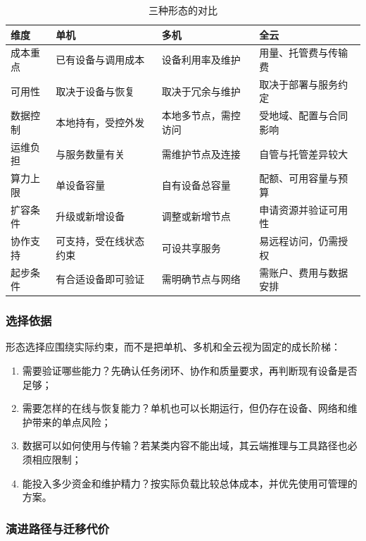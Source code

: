 \documentclass[11pt,a4paper]{article}
\begin{document}
\begin{table}[H]
\centering
\renewcommand{\arraystretch}{1.4}
\begin{tabularx}{\textwidth}{P{2.6cm} P{2.8cm} P{2.8cm} L}
\toprule
\textbf{维度} & \textbf{单机} & \textbf{多机} & \textbf{全云} \\
\midrule
成本重点 & 已有设备与调用成本 & 设备利用率及维护 & 用量、托管费与传输费 \\
可用性 & 取决于设备与恢复 & 取决于冗余与维护 & 取决于部署与服务约定 \\
数据控制 & 本地持有，受控外发 & 本地多节点，需控访问 & 受地域、配置与合同影响 \\
运维负担 & 与服务数量有关 & 需维护节点及连接 & 自管与托管差异较大 \\
算力上限 & 单设备容量 & 自有设备总容量 & 配额、可用容量与预算 \\
扩容条件 & 升级或新增设备 & 调整或新增节点 & 申请资源并验证可用性 \\
协作支持 & 可支持，受在线状态约束 & 可设共享服务 & 易远程访问，仍需授权 \\
起步条件 & 有合适设备即可验证 & 需明确节点与网络 & 需账户、费用与数据安排\\
\bottomrule
\end{tabularx}
\caption{三种形态的对比}
\end{table}

\subsubsection{选择依据}

形态选择应围绕实际约束，而不是把单机、多机和全云视为固定的成长阶梯：

\begin{enumerate}[leftmargin=2em,itemsep=4pt]
  \item 需要验证哪些能力？先确认任务闭环、协作和质量要求，再判断现有设备是否足够；
  \item 需要怎样的在线与恢复能力？单机也可以长期运行，但仍存在设备、网络和维护带来的单点风险；
  \item 数据可以如何使用与传输？若某类内容不能出域，其云端推理与工具路径也必须相应限制；
  \item 能投入多少资金和维护精力？按实际负载比较总体成本，并优先使用可管理的方案。
\end{enumerate}

\subsubsection{演进路径与迁移代价}
\end{document}
